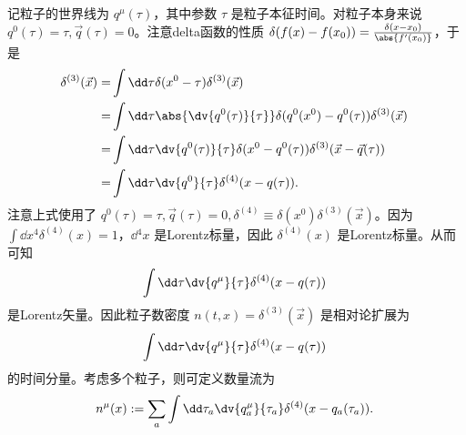 记粒子的世界线为 $q^\mu(\tau)$，其中参数 $\tau$ 是粒子本征时间。对粒子本身来说 $q^0(\tau)=\tau,\vec q(\tau)=0$。注意delta函数的性质 $\delta(f(x)-f(x_0))=\frac{\delta(x-x_0)}{\abs{f'(x_0)}}$，于是
\begin{equation}
\begin{aligned}
\delta^{(3)}(\vec x)=&\int\dd \tau\delta(x^0-\tau)\delta^{(3)}(\vec x)\\
=&\int\dd \tau\abs{\dv{q^0(\tau)}{\tau}}\delta(q^0(x^0)-q^0(\tau))\delta^{(3)}(\vec x)\\
=&\int\dd \tau\dv{q^0(\tau)}{\tau}\delta(x^0-q^0(\tau))\delta^{(3)}(\vec x-\vec q(\tau))\\
=&\int\dd \tau\dv{q^0}{\tau}\delta^{(4)}(x-q(\tau)).\\
\end{aligned}~
\end{equation}
注意上式使用了 $q^0(\tau)=\tau,\vec q(\tau)=0,\delta^{(4)}\equiv\delta(x^0)\delta^{(3)}(\vec x)$。因为 $\int\dd x^4\delta^{(4)}(x)=1$，$\dd{^4}x$ 是Lorentz标量，因此 $\delta^{(4)}(x)$ 是Lorentz标量。从而可知 
\begin{equation}
\int\dd \tau\dv{q^\mu}{\tau}\delta^{(4)}(x-q(\tau))~
\end{equation}
是Lorentz矢量。因此粒子数密度 $n(t,x)=\delta^{(3)}(\vec x)$ 是相对论扩展为
\begin{equation}
\int\dd \tau\dv{q^\mu}{\tau}\delta^{(4)}(x-q(\tau))~
\end{equation}
的时间分量。考虑多个粒子，则可定义数量流为
\begin{equation}
n^\mu(x):=\sum_a\int\dd \tau_a\dv{q_a^\mu}{\tau_a}\delta^{(4)}(x-q_a(\tau_a)).~
\end{equation}



















